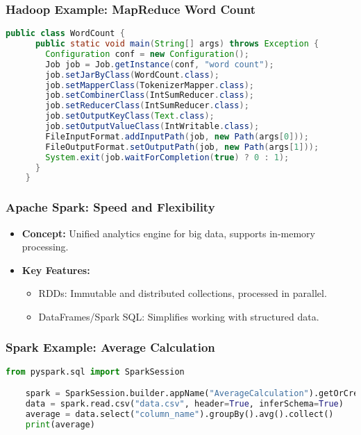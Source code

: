 \documentclass[aspectratio=169]{beamer}
\begin{document}
\begin{frame}[fragile]
    \frametitle{Hadoop Example: MapReduce Word Count}
    \begin{lstlisting}[language=Java]
    public class WordCount {
      public static void main(String[] args) throws Exception {
        Configuration conf = new Configuration();
        Job job = Job.getInstance(conf, "word count");
        job.setJarByClass(WordCount.class);
        job.setMapperClass(TokenizerMapper.class);
        job.setCombinerClass(IntSumReducer.class);
        job.setReducerClass(IntSumReducer.class);
        job.setOutputKeyClass(Text.class);
        job.setOutputValueClass(IntWritable.class);
        FileInputFormat.addInputPath(job, new Path(args[0]));
        FileOutputFormat.setOutputPath(job, new Path(args[1]));
        System.exit(job.waitForCompletion(true) ? 0 : 1);
      }
    }
    \end{lstlisting}
\end{frame}

\begin{frame}
    \frametitle{Apache Spark: Speed and Flexibility}
    \begin{itemize}
        \item \textbf{Concept:} Unified analytics engine for big data, supports in-memory processing.
        \item \textbf{Key Features:}
        \begin{itemize}
            \item RDDs: Immutable and distributed collections, processed in parallel.
            \item DataFrames/Spark SQL: Simplifies working with structured data.
        \end{itemize}
    \end{itemize}
\end{frame}

\begin{frame}[fragile]
    \frametitle{Spark Example: Average Calculation}
    \begin{lstlisting}[language=Python]
    from pyspark.sql import SparkSession

    spark = SparkSession.builder.appName("AverageCalculation").getOrCreate()
    data = spark.read.csv("data.csv", header=True, inferSchema=True)
    average = data.select("column_name").groupBy().avg().collect()
    print(average)
    \end{lstlisting}
\end{frame}
\end{document}
